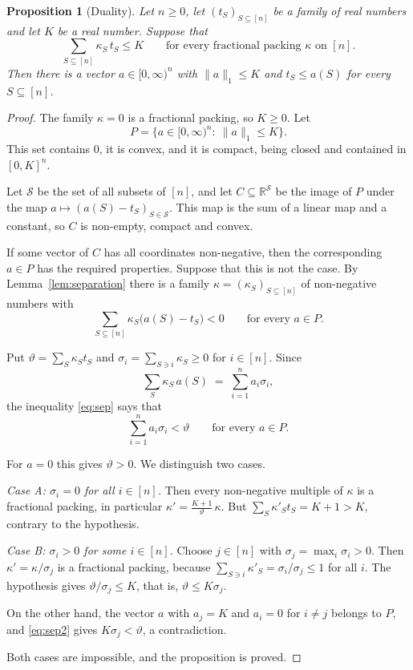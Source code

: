 \documentclass[11pt,reqno]{amsart}
\newtheorem{proposition}[theorem]{Proposition}
\theoremstyle{definition}
\theoremstyle{remark}
\numberwithin{equation}{section}
\theoremstyle{named}
\theoremstyle{plain}
\newcommand{\R}{\mathbb{R}}
\newcommand{\norm}[1]{\lVert #1\rVert_1}
\begin{document}
\begin{proposition}[Duality]\label{prop:duality}
Let $n\ge0$, let $(t_S)_{S\subseteq[n]}$ be a family of real numbers and let $K$ be a real number.
Suppose that
\[
   \sum_{S\subseteq[n]}\kappa_S\,t_S\le K\qquad\text{for every fractional packing $\kappa$ on $[n]$.}
\]
Then there is a vector $a\in[0,\infty)^{n}$ with $\norm{a}\le K$ and $t_S\le a(S)$ for every
$S\subseteq[n]$.
\end{proposition}

\begin{proof}
The family $\kappa=0$ is a fractional packing, so $K\ge0$. Let
\[
   P=\{a\in[0,\infty)^{n}:\ \norm{a}\le K\}.
\]
This set contains $0$, it is convex, and it is compact, being closed and contained in $[0,K]^{n}$.

Let $\mathcal S$ be the set of all subsets of $[n]$, and let $C\subseteq\R^{\mathcal S}$ be the image
of $P$ under the map $a\mapsto(a(S)-t_S)_{S\in\mathcal S}$. This map is the sum of a linear map and a
constant, so $C$ is non-empty, compact and convex.

If some vector of $C$ has all coordinates
non-negative, then the corresponding $a\in P$ has the required properties. Suppose that this is not
the case. By Lemma~\ref{lem:separation} there is a family $\kappa=(\kappa_S)_{S\subseteq[n]}$ of
non-negative numbers with
\begin{equation}\label{eq:sep}
   \sum_{S\subseteq[n]}\kappa_S\bigl(a(S)-t_S\bigr)<0\qquad\text{for every }a\in P .
\end{equation}

Put $\vartheta=\sum_S\kappa_St_S$ and $\sigma_i=\sum_{S\ni i}\kappa_S\ge0$ for $i\in[n]$. Since
\[
   \sum_S\kappa_S\,a(S)\;=\;\sum_{i=1}^{n}a_i\sigma_i ,
\]
the inequality \eqref{eq:sep} says that
\begin{equation}\label{eq:sep2}
   \sum_{i=1}^{n}a_i\sigma_i<\vartheta\qquad\text{for every }a\in P .
\end{equation}

For $a=0$ this gives $\vartheta>0$. We distinguish two cases.

\smallskip
\emph{Case A: $\sigma_i=0$ for all $i\in[n]$.} Then every non-negative multiple of $\kappa$ is a
fractional packing, in particular $\kappa'=\frac{K+1}{\vartheta}\,\kappa$. But
$\sum_S\kappa'_St_S=K+1>K$, contrary to the hypothesis.

\smallskip
\emph{Case B: $\sigma_i>0$ for some $i\in[n]$.} Choose $j\in[n]$ with $\sigma_j=\max_i\sigma_i>0$.
Then $\kappa'=\kappa/\sigma_j$ is a fractional packing, because
$\sum_{S\ni i}\kappa'_S=\sigma_i/\sigma_j\le1$ for all $i$. The hypothesis gives
$\vartheta/\sigma_j\le K$, that is, $\vartheta\le K\sigma_j$.

On the other hand, the vector $a$ with
$a_j=K$ and $a_i=0$ for $i\ne j$ belongs to $P$, and \eqref{eq:sep2} gives $K\sigma_j<\vartheta$, a
contradiction.

Both cases are impossible, and the proposition is proved.
\end{proof}
\end{document}
